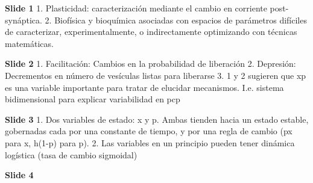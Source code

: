 
\textbf{Slide 1}
1. Plasticidad:  caracterización mediante el cambio en corriente
post-synáptica.
2. Biofísica y bioquímica asociadas con espacios de parámetros
difíciles de caracterizar, experimentalmente, o indirectamente
optimizando con técnicas matemáticas.

\textbf{Slide 2}
1. Facilitación: Cambios en la probabilidad de liberación
2. Depresión:  Decrementos en número de vesículas listas para liberarse
3. 1 y 2 sugieren que xp es una variable importante para tratar de
elucidar mecanismos. I.e. sistema bidimensional para explicar
variabilidad en pcp

\textbf{Slide 3}
1. Dos variables de estado: x y p. Ambas tienden hacia un estado
estable, gobernadas cada por una constante de tiempo, y por una regla
de cambio (px para x, h(1-p) para p). 
2. Las variables en un principio pueden tener dinámica logística
(tasa de cambio sigmoidal)

\textbf{Slide 4}
